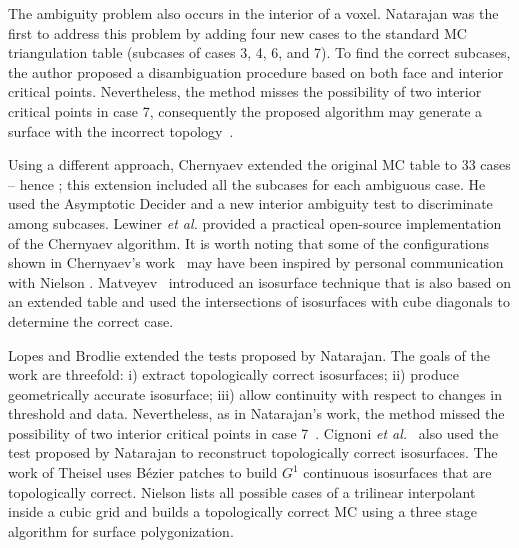 The ambiguity problem also occurs in the interior of a voxel. Natarajan \cite{Natarajan:1994:GTC:205424.205429}  was the first to address this problem by adding four new cases to the standard MC triangulation table (subcases of cases 3, 4, 6, and 7). To find the correct subcases, the author proposed a disambiguation procedure based on both face and interior critical points. Nevertheless,  the method misses the possibility of two interior critical points in case 7, consequently the proposed algorithm may generate a surface with the incorrect topology~\cite{10.1109/TVCG.2009.10, newman:candg:2006}.

Using a different approach, Chernyaev \cite{Chernyaev95marchingcubes} extended the original MC table to 33 cases -- hence \mc{}; this extension included all the subcases for each ambiguous case. He used the Asymptotic Decider and a new interior ambiguity test to discriminate among subcases. Lewiner \emph{et al.} \cite{Lewiner:2003} provided a practical open-source implementation of the Chernyaev algorithm. It is worth noting that some of the configurations shown in Chernyaev's work~\cite{Chernyaev95marchingcubes} may have been inspired by personal communication with Nielson \cite{Nielson03onmarching}.
%
Matveyev~\cite{Matveyev99} introduced an isosurface technique that is also based on an extended table and used the intersections of isosurfaces with cube diagonals to determine the correct case. 

Lopes and Brodlie \cite{lopes:tvcg:2003} extended the tests proposed by Natarajan. The goals of the work are threefold: i) extract topologically correct isosurfaces; ii) produce geometrically accurate isosurface; iii) allow continuity with respect to changes in threshold and data.  Nevertheless, as in Natarajan's work, the method missed the possibility of two interior critical points in case 7~\cite{lopes:tvcg:2003}.
%
Cignoni \emph{et al.}~\cite{Cignoni2000399} also used the test proposed by Natarajan to reconstruct topologically correct isosurfaces.
%
The work of Theisel \cite{CGF:CGF00563} uses B\'ezier patches to build $G^1$ continuous isosurfaces that are topologically correct.  Nielson \cite{Nielson03onmarching} lists all possible cases of a trilinear interpolant inside a cubic grid and builds a topologically correct MC using a three stage algorithm for surface polygonization. 

